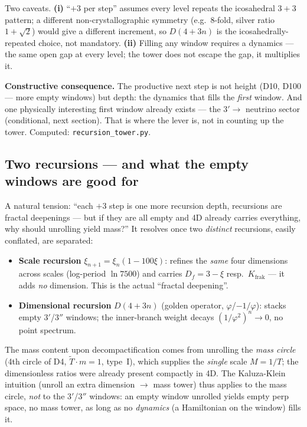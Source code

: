 Two caveats. \textbf{(i)} \enquote{$+3$ per step} assumes every level repeats the icosahedral
$3+3$ pattern; a different non-crystallographic symmetry (e.g.\ $8$-fold, silver ratio
$1+\sqrt2$) would give a different increment, so $D(4+3n)$ is the icosahedrally-repeated choice,
not mandatory. \textbf{(ii)} Filling any window requires a dynamics --- the same open gap at
every level; the tower does not escape the gap, it multiplies it.

\medskip\noindent\textbf{Constructive consequence.} The productive next step is not height
(D10, D100 --- more empty windows) but depth: the dynamics that fills the \emph{first} window.
And one physically interesting first window already exists --- the $3'\to$ neutrino sector
(conditional, next section). That is where the lever is, not in counting up the tower. Computed:
\texttt{recursion\_tower.py}.

\subsection{Two recursions --- and what the empty windows are good for}
A natural tension: \enquote{each $+3$ step is one more recursion depth, recursions are fractal
deepenings --- but if they are all empty and 4D already carries everything, why should unrolling
yield mass?} It resolves once two \emph{distinct} recursions, easily conflated, are separated:
\begin{itemize}
  \item \textbf{Scale recursion} $\xi_{n+1}=\xi_n(1-100\xi)$: refines the \emph{same} four
  dimensions across scales (log-period $\ln 7500$) and carries $D_f=3-\xi$ resp.\ $K_{\text{frak}}$
  --- it adds \emph{no} dimension. This is the actual \enquote{fractal deepening}.
  \item \textbf{Dimensional recursion} $D(4+3n)$ (golden operator, $\varphi$/$-1/\varphi$): stacks
  empty $3'$/$3''$ windows; the inner-branch weight decays $(1/\varphi^2)^n\to0$, no point spectrum.
\end{itemize}
The mass content upon decompactification comes from unrolling the \emph{mass circle} (4th circle of
D4, $\tilde T\cdot m=1$, type~I), which supplies the \emph{single} scale $M=1/T$; the dimensionless
ratios were already present compactly in 4D. The Kaluza-Klein intuition (unroll an extra dimension
$\to$ mass tower) thus applies to the mass circle, \emph{not} to the $3'$/$3''$ windows: an empty
window unrolled yields empty perp space, no mass tower, as long as no \emph{dynamics} (a Hamiltonian
on the window) fills it.

